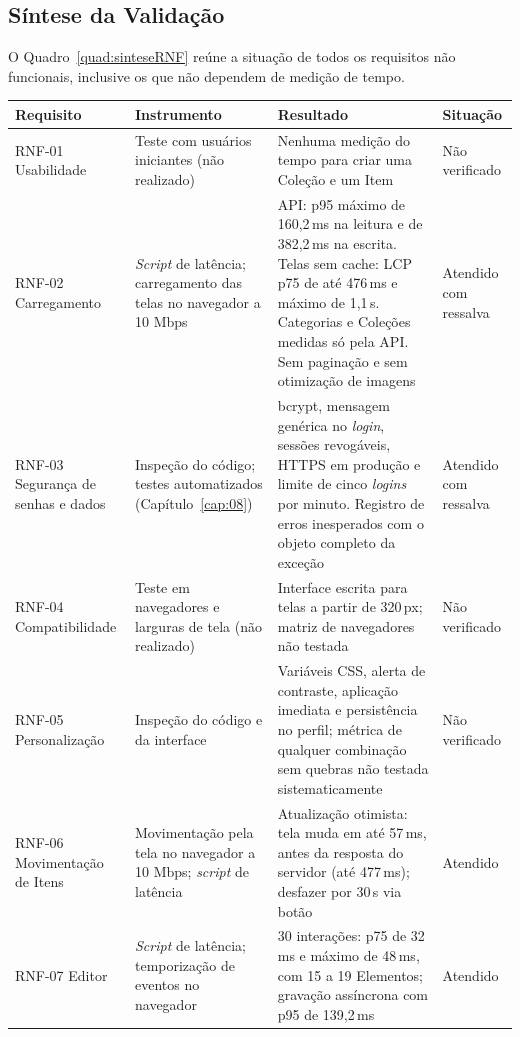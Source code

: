 \subsection{Síntese da Validação}

O Quadro~\ref{quad:sinteseRNF} reúne a situação de todos os requisitos não funcionais, inclusive os que não dependem de medição de tempo.

\FloatBarrier
\begin{quadro}[h!]
\caption{Síntese da validação dos requisitos não funcionais}
\label{quad:sinteseRNF}
\footnotesize
\begin{tabular}{|p{2.3cm}|p{3.3cm}|p{5.7cm}|p{2.2cm}|}
\hline
\textbf{Requisito} & \textbf{Instrumento} & \textbf{Resultado} & \textbf{Situação} \\ \hline
RNF-01 Usabilidade & Teste com usuários iniciantes (não realizado) & Nenhuma medição do tempo para criar uma Coleção e um Item & Não verificado \\ \hline
RNF-02 Carregamento & \textit{Script} de latência; carregamento das telas no navegador a 10 Mbps & API: p95 máximo de 160,2\,ms na leitura e de 382,2\,ms na escrita. Telas sem cache: LCP p75 de até 476\,ms e máximo de 1,1\,s. Categorias e Coleções medidas só pela API. Sem paginação e sem otimização de imagens & Atendido com ressalva \\ \hline
RNF-03 Segurança de senhas e dados & Inspeção do código; testes automatizados (Capítulo~\ref{cap:08}) & bcrypt, mensagem genérica no \textit{login}, sessões revogáveis, HTTPS em produção e limite de cinco \textit{logins} por minuto. Registro de erros inesperados com o objeto completo da exceção & Atendido com ressalva \\ \hline
RNF-04 Compatibilidade & Teste em navegadores e larguras de tela (não realizado) & Interface escrita para telas a partir de 320\,px; matriz de navegadores não testada & Não verificado \\ \hline
RNF-05 Personalização & Inspeção do código e da interface & Variáveis CSS, alerta de contraste, aplicação imediata e persistência no perfil; métrica de qualquer combinação sem quebras não testada sistematicamente & Não verificado \\ \hline
RNF-06 Movimentação de Itens & Movimentação pela tela no navegador a 10 Mbps; \textit{script} de latência & Atualização otimista: tela muda em até 57\,ms, antes da resposta do servidor (até 477\,ms); desfazer por 30\,s via botão & Atendido \\ \hline
RNF-07 Editor & \textit{Script} de latência; temporização de eventos no navegador & 30 interações: p75 de 32\,ms e máximo de 48\,ms, com 15 a 19 Elementos; gravação assíncrona com p95 de 139,2\,ms & Atendido \\ \hline

\end{tabular}
\end{quadro}
